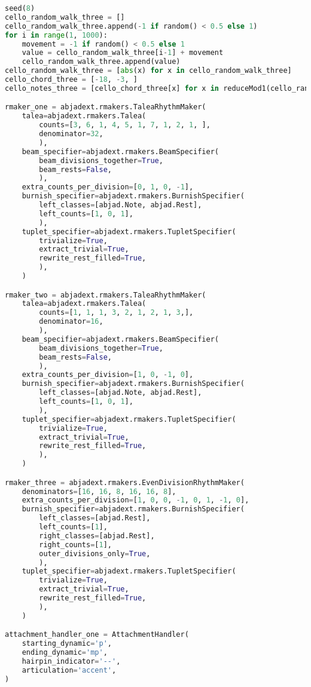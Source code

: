 \begin{lstlisting}[language=Python, caption=Four Ages of Sand Segment\_IV]
seed(8)
cello_random_walk_three = []
cello_random_walk_three.append(-1 if random() < 0.5 else 1)
for i in range(1, 1000):
    movement = -1 if random() < 0.5 else 1
    value = cello_random_walk_three[i-1] + movement
    cello_random_walk_three.append(value)
cello_random_walk_three = [abs(x) for x in cello_random_walk_three]
cello_chord_three = [-18, -3, ]
cello_notes_three = [cello_chord_three[x] for x in reduceMod1(cello_random_walk_three)]

rmaker_one = abjadext.rmakers.TaleaRhythmMaker(
    talea=abjadext.rmakers.Talea(
        counts=[3, 6, 1, 4, 5, 1, 7, 1, 2, 1, ],
        denominator=32,
        ),
    beam_specifier=abjadext.rmakers.BeamSpecifier(
        beam_divisions_together=True,
        beam_rests=False,
        ),
    extra_counts_per_division=[0, 1, 0, -1],
    burnish_specifier=abjadext.rmakers.BurnishSpecifier(
        left_classes=[abjad.Note, abjad.Rest],
        left_counts=[1, 0, 1],
        ),
    tuplet_specifier=abjadext.rmakers.TupletSpecifier(
        trivialize=True,
        extract_trivial=True,
        rewrite_rest_filled=True,
        ),
    )

rmaker_two = abjadext.rmakers.TaleaRhythmMaker(
    talea=abjadext.rmakers.Talea(
        counts=[1, 1, 1, 3, 2, 1, 2, 1, 3,],
        denominator=16,
        ),
    beam_specifier=abjadext.rmakers.BeamSpecifier(
        beam_divisions_together=True,
        beam_rests=False,
        ),
    extra_counts_per_division=[1, 0, -1, 0],
    burnish_specifier=abjadext.rmakers.BurnishSpecifier(
        left_classes=[abjad.Note, abjad.Rest],
        left_counts=[1, 0, 1],
        ),
    tuplet_specifier=abjadext.rmakers.TupletSpecifier(
        trivialize=True,
        extract_trivial=True,
        rewrite_rest_filled=True,
        ),
    )

rmaker_three = abjadext.rmakers.EvenDivisionRhythmMaker(
    denominators=[16, 16, 8, 16, 16, 8],
    extra_counts_per_division=[1, 0, 0, -1, 0, 1, -1, 0],
    burnish_specifier=abjadext.rmakers.BurnishSpecifier(
        left_classes=[abjad.Rest],
        left_counts=[1],
        right_classes=[abjad.Rest],
        right_counts=[1],
        outer_divisions_only=True,
        ),
    tuplet_specifier=abjadext.rmakers.TupletSpecifier(
        trivialize=True,
        extract_trivial=True,
        rewrite_rest_filled=True,
        ),
    )

attachment_handler_one = AttachmentHandler(
    starting_dynamic='p',
    ending_dynamic='mp',
    hairpin_indicator='--',
    articulation='accent',
)


\end{lstlisting}
